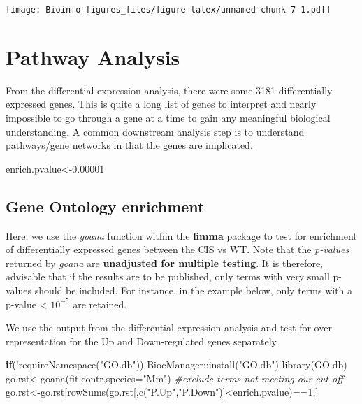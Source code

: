 \documentclass[
  openany]{book}
\newenvironment{Shaded}{\begin{snugshade}}{\end{snugshade}}
\newcommand{\AttributeTok}[1]{\textcolor[rgb]{0.77,0.63,0.00}{#1}}
\newcommand{\CommentTok}[1]{\textcolor[rgb]{0.56,0.35,0.01}{\textit{#1}}}
\newcommand{\ControlFlowTok}[1]{\textcolor[rgb]{0.13,0.29,0.53}{\textbf{#1}}}
\newcommand{\DecValTok}[1]{\textcolor[rgb]{0.00,0.00,0.81}{#1}}
\newcommand{\FloatTok}[1]{\textcolor[rgb]{0.00,0.00,0.81}{#1}}
\newcommand{\FunctionTok}[1]{\textcolor[rgb]{0.00,0.00,0.00}{#1}}
\newcommand{\NormalTok}[1]{#1}
\newcommand{\OtherTok}[1]{\textcolor[rgb]{0.56,0.35,0.01}{#1}}
\newcommand{\SpecialCharTok}[1]{\textcolor[rgb]{0.00,0.00,0.00}{#1}}
\newcommand{\StringTok}[1]{\textcolor[rgb]{0.31,0.60,0.02}{#1}}
\begin{document}
\texttt{[image: Bioinfo-figures\_files/figure-latex/unnamed-chunk-7-1.pdf]}

\hypertarget{pathway-analysis}{%
\section{Pathway Analysis}\label{pathway-analysis}}

From the differential expression analysis, there were some 3181 differentially expressed genes. This is quite a long list of genes to interpret and nearly impossible to go through a gene at a time to gain any meaningful biological understanding. A common downstream analysis step is to understand pathways/gene networks in that the genes are implicated.

\begin{Shaded}
\begin{Highlighting}[]
\NormalTok{enrich.pvalue}\OtherTok{\textless{}{-}}\FloatTok{0.00001}
\end{Highlighting}
\end{Shaded}

\hypertarget{gene-ontology-enrichment}{%
\subsection{Gene Ontology enrichment}\label{gene-ontology-enrichment}}

Here, we use the \emph{goana} function within the \textbf{limma} package to test for enrichment of differentially expressed genes between the CIS vs WT. Note that the \emph{p-values} returned by \emph{goana} are \textbf{unadjusted for multiple testing}. It is therefore, advisable that if the results are to be published, only terms with very small p-values should be included. For instance, in the example below, only terms with a p-value \textless{} \ensuremath{10^{-5}} are retained.

We use the output from the differential expression analysis and test for over representation for the Up and Down-regulated genes separately.

\begin{Shaded}
\begin{Highlighting}[]
\ControlFlowTok{if}\NormalTok{(}\SpecialCharTok{!}\FunctionTok{requireNamespace}\NormalTok{(}\StringTok{"GO.db"}\NormalTok{))}
\NormalTok{  BiocManager}\SpecialCharTok{::}\FunctionTok{install}\NormalTok{(}\StringTok{"GO.db"}\NormalTok{)}
\FunctionTok{library}\NormalTok{(GO.db)}
\NormalTok{go.rst}\OtherTok{\textless{}{-}}\FunctionTok{goana}\NormalTok{(fit.contr,}\AttributeTok{species=}\StringTok{"Mm"}\NormalTok{)}
\CommentTok{\#exclude terms not meeting our cut{-}off}
\NormalTok{go.rst}\OtherTok{\textless{}{-}}\NormalTok{go.rst[}\FunctionTok{rowSums}\NormalTok{(go.rst[,}\FunctionTok{c}\NormalTok{(}\StringTok{"P.Up"}\NormalTok{,}\StringTok{"P.Down"}\NormalTok{)]}\SpecialCharTok{\textless{}}\NormalTok{enrich.pvalue)}\SpecialCharTok{==}\DecValTok{1}\NormalTok{,]}
\end{Highlighting}
\end{Shaded}
\end{document}
